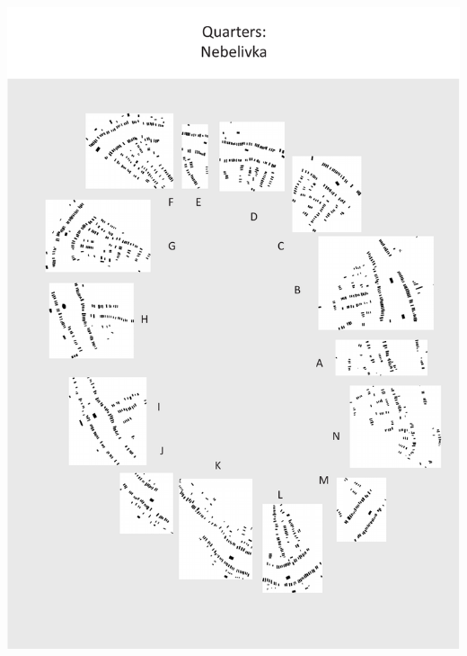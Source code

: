 \documentclass[
  12pt,
  a4paper, twoside]{book}
\begin{document}
\begin{center}\includegraphics[width=1\linewidth]{Appendix/quart_neb} \end{center}

\newpage
\end{document}
